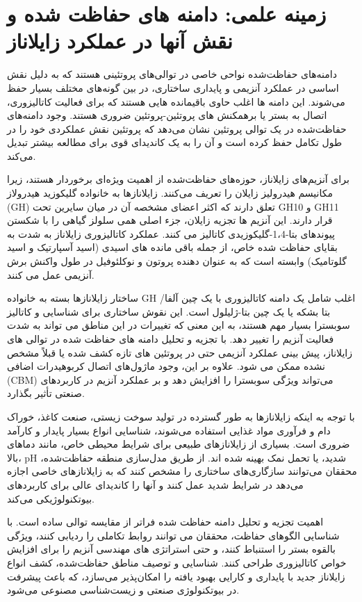         \section{زمینه علمی: دامنه های حفاظت شده و نقش آنها در عملکرد زایلاناز}
            دامنه‌های حفاظت‌شده نواحی خاصی در توالی‌های پروتئینی هستند که به دلیل نقش اساسی در عملکرد آنزیمی و پایداری ساختاری، در بین گونه‌های مختلف بسیار حفظ می‌شوند. این دامنه ها اغلب حاوی باقیمانده هایی هستند که برای فعالیت کاتالیزوری، اتصال به بستر یا برهمکنش های پروتئین-پروتئین ضروری هستند. وجود دامنه‌های حفاظت‌شده در یک توالی پروتئین نشان می‌دهد که پروتئین نقش عملکردی خود را در طول تکامل حفظ کرده است و آن را به یک کاندیدای قوی برای مطالعه بیشتر تبدیل می‌کند.

            برای آنزیم‌های زایلاناز، حوزه‌های حفاظت‌شده از اهمیت ویژه‌ای برخوردار هستند، زیرا مکانیسم هیدرولیز زایلان را تعریف می‌کنند. زایلانازها به خانواده گلیکوزید هیدرولاز (GH) تعلق دارند که اکثر اعضای مشخصه آن در میان سایرین تحت GH10 و GH11 قرار دارند. این آنزیم ها تجزیه زایلان، جزء اصلی همی سلولز گیاهی را با شکستن پیوندهای بتا-1،4-گلیکوزیدی کاتالیز می کنند. عملکرد کاتالیزوری زایلاناز به شدت به بقایای حفاظت شده خاص، از جمله باقی مانده های اسیدی (اسید آسپارتیک و اسید گلوتامیک) وابسته است که به عنوان دهنده پروتون و نوکلئوفیل در طول واکنش برش آنزیمی عمل می کنند.
            
            ساختار زایلانازها بسته به خانواده GH اغلب شامل یک دامنه کاتالیزوری با یک چین آلفا/بتا بشکه یا یک چین بتا-ژلیلول است. این نقوش ساختاری برای شناسایی و کاتالیز سوبسترا بسیار مهم هستند، به این معنی که تغییرات در این مناطق می تواند به شدت فعالیت آنزیم را تغییر دهد. با تجزیه و تحلیل دامنه های حفاظت شده در توالی های زایلاناز، پیش بینی عملکرد آنزیمی حتی در پروتئین های تازه کشف شده یا قبلاً مشخص نشده ممکن می شود. علاوه بر این، وجود ماژول‌های اتصال کربوهیدرات اضافی (CBM) می‌تواند ویژگی سوبسترا را افزایش دهد و بر عملکرد آنزیم در کاربردهای صنعتی تأثیر بگذارد.
            
            با توجه به اینکه زایلانازها به طور گسترده در تولید سوخت زیستی، صنعت کاغذ، خوراک دام و فرآوری مواد غذایی استفاده می‌شوند، شناسایی انواع بسیار پایدار و کارآمد ضروری است. بسیاری از زایلانازهای طبیعی برای شرایط محیطی خاص، مانند دماهای بالا، pH شدید، یا تحمل نمک بهینه شده اند. از طریق مدل‌سازی منطقه حفاظت‌شده، محققان می‌توانند سازگاری‌های ساختاری را مشخص کنند که به زایلانازهای خاصی اجازه می‌دهد در شرایط شدید عمل کنند و آنها را کاندیدای عالی برای کاربردهای بیوتکنولوژیکی می‌کند.
            
            اهمیت تجزیه و تحلیل دامنه حفاظت شده فراتر از مقایسه توالی ساده است. با شناسایی الگوهای حفاظت، محققان می توانند روابط تکاملی را ردیابی کنند، ویژگی بالقوه بستر را استنباط کنند، و حتی استراتژی های مهندسی آنزیم را برای افزایش خواص کاتالیزوری طراحی کنند. شناسایی و توصیف مناطق حفاظت‌شده، کشف انواع زایلاناز جدید با پایداری و کارایی بهبود یافته را امکان‌پذیر می‌سازد، که باعث پیشرفت در بیوتکنولوژی صنعتی و زیست‌شناسی مصنوعی می‌شود.

